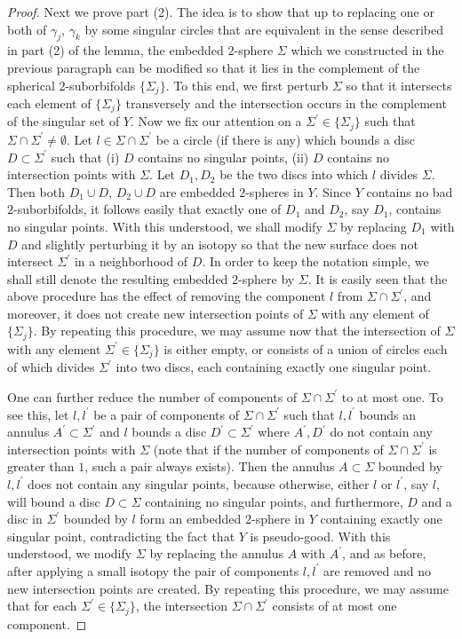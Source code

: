 \documentclass[11pt]{amsart}
\theoremstyle{plain}
\numberwithin{theorem}{section}
\theoremstyle{definition}
\begin{document}
\begin{proof}
Next we prove part (2). The idea is to show that up to replacing one or both of $\gamma_j$,
$\gamma_k$ by some singular circles that are equivalent in the sense described in 
part (2) of the lemma, the embedded $2$-sphere $\Sigma$ which we constructed in the previous 
paragraph can be modified so that it lies in
the complement of the spherical $2$-suborbifolds $\{\Sigma_j\}$. To this end, we first perturb
$\Sigma$ so that it intersects each element of $\{\Sigma_j\}$ transversely and the intersection
occurs in the complement of the singular set of $Y$. Now we fix our attention on a 
$\Sigma^\prime\in\{\Sigma_j\}$ such that $\Sigma\cap \Sigma^\prime\neq \emptyset$. Let 
$l\in \Sigma\cap\Sigma^\prime$ be a circle (if there is any) which bounds a disc 
$D\subset \Sigma^\prime$ such that (i) $D$ contains no singular points, (ii) $D$ contains no intersection points with $\Sigma$. Let $D_1,D_2$ be the two discs into which $l$ divides 
$\Sigma$. Then both $D_1\cup D$, $D_2\cup D$ are embedded $2$-spheres in $Y$. Since $Y$
contains no bad $2$-suborbifolds, it follows easily that exactly one of $D_1$ and $D_2$, 
say $D_1$, contains no singular points. With this understood, we shall modify $\Sigma$
by replacing $D_1$ with $D$ and slightly perturbing it by an isotopy so that the new surface 
does not intersect $\Sigma^\prime$ in a neighborhood of $D$. In order to keep the notation simple, we shall still denote the resulting embedded $2$-sphere by $\Sigma$. It is easily seen that the 
above procedure has the effect of removing the component $l$ from $\Sigma\cap \Sigma^\prime$, and moreover,  it does not create new intersection points of $\Sigma$ with any element of 
$\{\Sigma_j\}$.  By repeating this procedure, we may assume now that the intersection of
$\Sigma$ with any element $\Sigma^\prime\in \{\Sigma_j\}$ is either empty, or consists of a 
union of circles each of which divides $\Sigma^\prime$ into two discs, each containing exactly
one singular point. 

One can further reduce the number of components of $\Sigma\cap\Sigma^\prime$ to at most
one. To see this, let $l,l^\prime$ be a pair of components of $\Sigma\cap\Sigma^\prime$ 
such that $l,l^\prime$ bounds an annulus $A^\prime\subset\Sigma^\prime$ and $l$ bounds 
a disc $D^\prime\subset \Sigma^\prime$ where $A^\prime, D^\prime$ do not contain any 
intersection points with $\Sigma$ (note that if the number of components of 
$\Sigma\cap\Sigma^\prime$ is greater than $1$, such a pair always exists). Then the annulus
$A\subset\Sigma$ bounded by $l,l^\prime$ does not contain any singular points, because 
otherwise, either $l$ or $l^\prime$, say $l$, will bound a disc $D\subset \Sigma$ containing no singular points, and furthermore, $D$ and a disc in $\Sigma^\prime$ bounded by $l$ form
an embedded $2$-sphere in $Y$ containing exactly one singular point, contradicting
the fact that $Y$ is pseudo-good. With this understood, we modify $\Sigma$ by replacing
the annulus $A$ with $A^\prime$, and as before, after applying a small isotopy the pair of
components $l,l^\prime$ are removed and no new intersection points are created. By repeating
this procedure, we may assume that for each $\Sigma^\prime\in\{\Sigma_j\}$, 
the intersection $\Sigma\cap\Sigma^\prime$ consists of at most one component. 


\end{proof}
\end{document}
